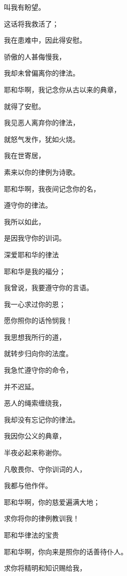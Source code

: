 {\par }{\Q 叫我有盼望。
\par }{\Q {}这话将我救活了；
\par }{\Q 我在患难中，因此得安慰。
\par }{\Q {}骄傲的人甚侮慢我，
\par }{\Q 我却未曾偏离你的律法。
\par }{\Q {}耶和华啊，我记念你从古以来的典章，
\par }{\Q 就得了安慰。
\par }{\Q {}我见恶人离弃你的律法，
\par }{\Q 就怒气发作，犹如火烧。
\par }{\Q {}我在世寄居，
\par }{\Q 素来以你的律例为诗歌。
\par }{\Q {}耶和华啊，我夜间记念你的名，
\par }{\Q 遵守你的律法。
\par }{\Q {}我所以如此，
\par }{\Q 是因我守你的训词。
\par }{\SH 深爱耶和华的律法
\par }{\Q {}耶和华是我的福分；
\par }{\Q 我曾说，我要遵守你的言语。
\par }{\Q {}我一心求过你的恩；
\par }{\Q 愿你照你的话怜悯我！
\par }{\Q {}我思想我所行的道，
\par }{\Q 就转步归向你的法度。
\par }{\Q {}我急忙遵守你的命令，
\par }{\Q 并不迟延。
\par }{\Q {}恶人的绳索缠绕我，
\par }{\Q 我却没有忘记你的律法。
\par }{\Q {}我因你公义的典章，
\par }{\Q 半夜必起来称谢你。
\par }{\Q {}凡敬畏你、守你训词的人，
\par }{\Q 我都与他作伴。
\par }{\Q {}耶和华啊，你的慈爱遍满大地；
\par }{\Q 求你将你的律例教训我！
\par }{\SH 耶和华律法的宝贵
\par }{\Q {}耶和华啊，你向来是照你的话善待仆人。
\par }{\Q {}求你将精明和知识赐给我，
}
